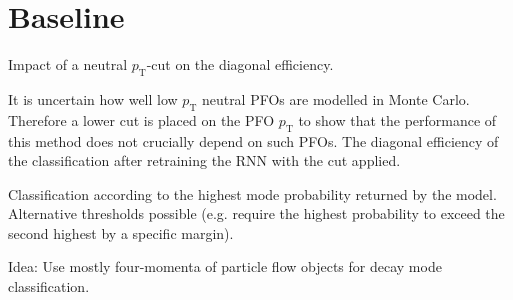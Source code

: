 
\section{Baseline}
\label{sec:pfo_baseline}

\begin{table}[ht]
  \centering
  
  \caption{Impact of a neutral $p_\text{T}$-cut on the diagonal
    efficiency.}
  \label{tab:neut_ptcut}
\end{table}

It is uncertain how well low $p_\text{T}$ neutral PFOs are modelled in Monte
Carlo. Therefore a lower cut is placed on the PFO $p_\text{T}$ to show that the
performance of this method does not crucially depend on such PFOs. The diagonal
efficiency of the classification after retraining the RNN with the cut applied.

Classification according to the highest mode probability returned by the model.
Alternative thresholds possible (e.g. require the highest probability to exceed
the second highest by a specific margin).



Idea: Use mostly four-momenta of particle flow objects for decay mode
classification.

